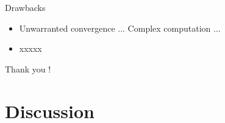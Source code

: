 \begin{frame}
    \begin{block}{Drawbacks}
        \begin{itemize}
            \item Unwarranted convergence ... Complex computation ... 
            \item xxxxx
        \end{itemize}
    \end{block}

    \vspace{24pt}
\begin{flushright}
    Thank you !
\end{flushright}
\end{frame}

\section*{Discussion}
\begin{frame}    
    \sectionpage
\end{frame}